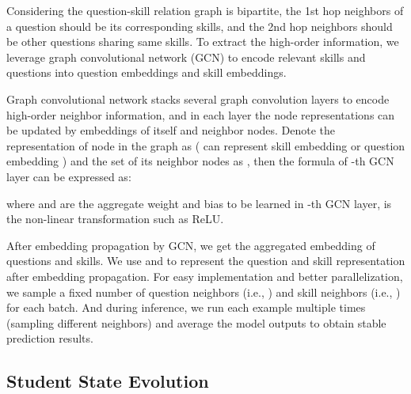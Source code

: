 \documentclass[runningheads]{llncs}
\begin{document}
Considering the question-skill relation graph is bipartite, the 1st hop neighbors of a question should be its corresponding skills, and the 2nd hop neighbors should be other questions sharing same skills. To extract the high-order information, we leverage graph convolutional network (GCN)  \cite{kipf2016semi} to encode relevant skills and questions into question embeddings and skill embeddings.




Graph convolutional network stacks several graph convolution layers to encode high-order neighbor information, and in each layer the node representations can be updated by embeddings of itself and neighbor nodes. Denote the representation of node  in the graph as  ( can represent skill embedding  or question embedding ) and the set of its neighbor nodes as , then the formula of -th GCN layer can be expressed as:




where  and  are the aggregate weight and bias to be learned in -th GCN layer,  is the non-linear transformation such as ReLU.












After embedding  propagation by GCN, we get the aggregated embedding of questions and skills. We use  and  to represent the question and skill representation after embedding propagation. For easy implementation and better parallelization, we sample a fixed number of question neighbors (i.e., ) and skill neighbors (i.e., ) for each batch. And during inference, we run each example multiple times (sampling different neighbors) and average the model outputs to obtain stable prediction results.



























\subsection{Student State Evolution}
\end{document}
